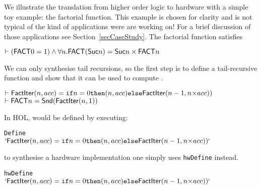 \vspace*{-2mm}

We illustrate the translation from higher order logic to hardware with a
simple toy example: the factorial function. This example is chosen for
clarity and is not typical of the kind of
applications were are working on!  For a brief discussion of those
applications see Section~\ref{secCaseStudy}.
The factorial function  satisfies

\vspace*{-1mm}

{\baselineskip10pt\begin{alltt}
 \(\vdash (\DEF{FACT} 0 = 1) \wedge {\forall}n. \DEF{FACT}(\DEF{Suc} n) = \DEF{Suc} n \times \DEF{FACT} n\)
\end{alltt}}

\vspace*{-2mm}
We can only synthesise tail recursions, so the first
step is to define a tail-recursive function  and show
that it can be used to compute .

\vspace*{-2mm}

{\baselineskip14pt\begin{alltt}
\( \vdash \DEF{FactIter}(n,acc) = \texttt{if} n=0 \texttt{then} (n,acc) \texttt{else} \DEF{FactIter}(n-1,n{\times}acc)) \)
\( \vdash \DEF{FACT} n = \DEF{Snd}(\DEF{FactIter}(n,1)) \)
\end{alltt}}

\vspace*{-2mm}

\noindent In HOL,  would be defined by executing:

\vspace*{-2mm}

{\baselineskip10pt\begin{alltt}
 Define
\(  `\DEF{FactIter}(n,acc) = \texttt{if} n=0 \texttt{then} (n,acc) \texttt{else} \DEF{FactIter}(n-1,n{\times}acc))`\)
\end{alltt}}

\vspace*{-2mm}

\noindent to synthesise a hardware implementation one simply uses
\texttt{hwDefine} instead.

\vspace*{-2mm}


{\baselineskip10pt\begin{alltt}
 hwDefine
\(  `\DEF{FactIter}(n,acc) = \texttt{if} n=0 \texttt{then} (n,acc) \texttt{else} \DEF{FactIter}(n-1,n{\times}acc))`\)
\end{alltt}}



